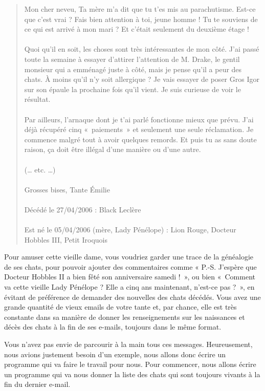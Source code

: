 \documentclass{FramateX}
\begin{document}
\begin{quote}
Mon cher neveu, Ta mère m'a dit que tu t'es mis au parachutisme. Est-ce
que c'est vrai ? Fais bien attention à toi, jeune homme ! Tu te souviens
de ce qui est arrivé à mon mari ? Et c'était seulement du deuxième étage
!\\\\Quoi qu'il en soit, les choses sont très intéressantes de mon côté.
J'ai passé toute la semaine à essayer d'attirer l'attention de M. Drake,
le gentil monsieur qui a emménagé juste à côté, mais je pense qu'il a
peur des chats. À moins qu'il n'y soit allergique ? Je vais essayer de
poser Gros Igor sur son épaule la prochaine fois qu'il vient. Je suis
curieuse de voir le résultat.\\\\Par ailleurs, l'arnaque dont je t'ai
parlé fonctionne mieux que prévu. J'ai déjà récupéré cinq «~paiements~»
et seulement une seule réclamation. Je commence malgré tout à avoir
quelques remords. Et puis tu as sans doute raison, ça doit être illégal
d'une manière ou d'une autre.\\\\(\ldots{} etc. \ldots{})\\\\Grosses
bises, Tante Émilie\\\\Décédé le 27/04/2006 : Black Leclère\\\\Est né le
05/04/2006 (mère, Lady Pénélope) : Lion Rouge, Docteur Hobbles III,
Petit Iroquois
\end{quote}
Pour amuser cette vieille dame, vous voudriez garder une trace de la
généalogie de ses chats, pour pouvoir ajouter des commentaires comme «
P.-S. J'espère que Docteur Hobbles II a bien fêté son anniversaire
samedi !~», ou bien «~Comment va cette vieille Lady Pénélope ? Elle a
cinq ans maintenant, n'est-ce pas ?~», en évitant de préférence de
demander des nouvelles des chats décédés. Vous avez une grande quantité
de vieux emails de votre tante et, par chance, elle est très constante
dans sa manière de donner les renseignements sur les naissances et décès
des chats à la fin de ses e-mails, toujours dans le même format.

Vous n'avez pas envie de parcourir à la main tous ces messages.
Heureusement, nous avions justement besoin d'un exemple, nous allons
donc écrire un programme qui va faire le travail pour nous. Pour
commencer, nous allons écrire un programme qui va nous donner la liste
des chats qui sont toujours vivants à la fin du dernier e-mail.
\end{document}
